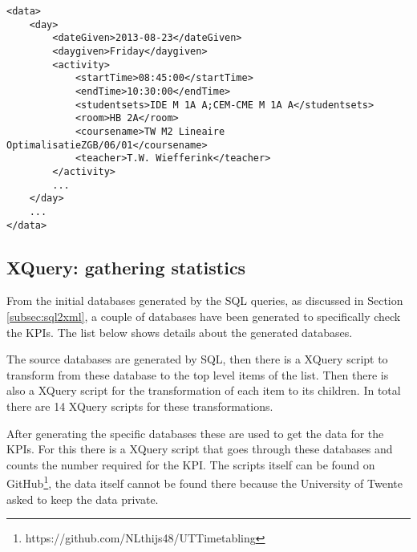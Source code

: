 \begin{lstlisting}[caption=XML structure, label=lst:xmlStructure, float=htpb]
<data>
	<day>
		<dateGiven>2013-08-23</dateGiven>
		<daygiven>Friday</daygiven>
		<activity>
			<startTime>08:45:00</startTime>
			<endTime>10:30:00</endTime>
			<studentsets>IDE M 1A A;CEM-CME M 1A A</studentsets>
			<room>HB 2A</room>
			<coursename>TW M2 Lineaire OptimalisatieZGB/06/01</coursename>
			<teacher>T.W. Wiefferink</teacher>
		</activity>
		...
	</day>
	...
</data>
\end{lstlisting}

\subsection{XQuery: gathering statistics} \label{subsec:xquery}
From the initial databases generated by the SQL queries, as discussed in Section \ref{subsec:sql2xml}, a couple of databases have been generated to specifically check the KPIs. The list below shows details about the generated databases. 

The source databases are generated by SQL, then there is a XQuery script to transform from these database to the top level items of the list. Then there is also a XQuery script for the transformation of each item to its children. In total there are 14 XQuery scripts for these transformations.

After generating the specific databases these are used to get the data for the KPIs. For this there is a XQuery script that goes through these databases and counts the number required for the KPI. The scripts itself can be found on GitHub\footnote{https://github.com/NLthijs48/UTTimetabling}, the data itself cannot be found there because the University of Twente asked to keep the data private.

